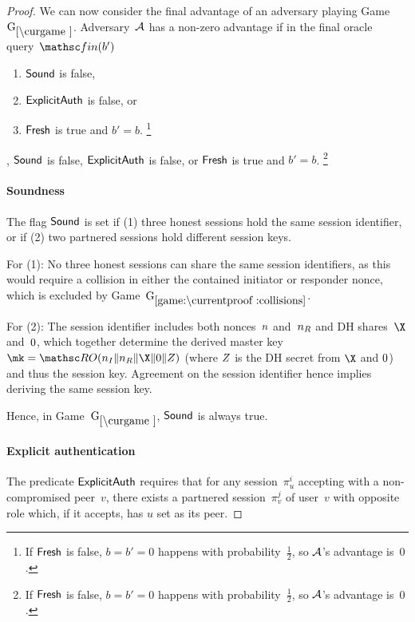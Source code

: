 \begin{proof}
%
%
We can now consider the final advantage of an adversary playing Game~$\curGm$.
Adversary~$\mathcal{A}$ has a non-zero advantage if in the final oracle query~$\Finalize(b')$%
\iffull
\begin{enumerate}
	\item $\mathsf{Sound}$ is false,
	\item $\mathsf{ExplicitAuth}$ is false, or
	\item $\mathsf{Fresh}$ is true and $b' = b$.%
	\footnote{If $\mathsf{Fresh}$ is false, $b = b' = 0$ happens with probability~$\frac{1}{2}$, so $\mathcal{A}$'s advantage is~$0$.}
\end{enumerate}
\else
,	$\mathsf{Sound}$ is false,
	$\mathsf{ExplicitAuth}$ is false, or
	$\mathsf{Fresh}$ is true and $b' = b$.%
	\footnote{If $\mathsf{Fresh}$ is false, $b = b' = 0$ happens with probability~$\frac{1}{2}$, so $\mathcal{A}$'s advantage is~$0$.}
\fi

\paragraph{Soundness}
The flag $\mathsf{Sound}$ is set if (1) three honest sessions hold the same session identifier,
or if (2) two partnered sessions hold different session keys.

For (1):
No three honest sessions can share the same session identifiers,
as this would require a collision in either the contained initiator or responder nonce,
which is excluded by Game~$\lblGm{collisions}$.

For (2):
The session identifier includes both nonces~$n$ and~$n_R$ and DH shares~$\X$ and~$\Y$,
which together determine the derived master key~$\mk = \RO(\nonce_I \| \nonce_R \| \X \| \Y \| \Zz)$ (where $Z$ is the DH secret from $\X$ and $\Y$) and thus the session key.
Agreement on the session identifier hence implies deriving the same session key.

Hence, in Game~$\curGm$, $\mathsf{Sound}$ is always true.


\paragraph{Explicit authentication}
The predicate $\mathsf{ExplicitAuth}$ requires that for any session~$\pi_u^i$ accepting with a non-compromised peer~$v$,
there exists a partnered session~$\pi_v^j$ of user~$v$ with opposite role
which, if it accepts, has $u$ set as its peer.


\end{proof}
